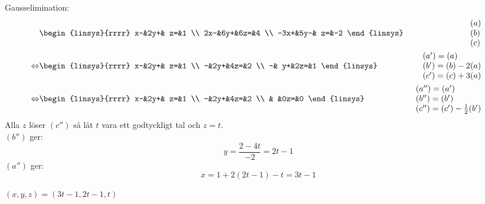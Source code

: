\begin{task}{1.11}
	Gausselimination:
	\begin{align*}
		&\begin{linsys}{rrrr}
			  x-&2y+& z=&1 \\
			 2x-&6y+&6z=&4 \\
			-3x+&5y-& z=&-2
		\end{linsys}
		&\begin{array}{l} 
			(a) \\ 
			(b) \\
			(c) 
		\end{array} \\ \lra
		&\begin{linsys}{rrrr}
			x-&2y+& z=&1 \\
			 -&2y+&4z=&2 \\
			 -& y+&2z=&1
		\end{linsys}
		&\begin{array}{l} 
			(a')=(a) \\ 
			(b')=(b)-2(a) \\
			(c')=(c)+3(a)
		\end{array} \\ \lra
		&\begin{linsys}{rrrr}
			x-&2y+& z=&1 \\
			 -&2y+&4z=&2 \\
			  &   &0z=&0
		\end{linsys}
		&\begin{array}{l} 
			(a'')=(a') \\ 
			(b'')=(b') \\
			(c'')=(c')-\frac{1}{2}(b')
		\end{array}
	\end{align*}
	Alla $z$ löser $(c'')$ så låt $t$ vara ett godtyckligt tal och $z= t$. \\
	$(b'')$ ger:
	\[y=\frac{2-4t}{-2}=2t-1\]
	$(a'')$ ger:
	\[x=1+2(2t-1)-t=3t-1\]
	
	\ans $(x,y,z)=(3t-1,2t-1,t)$
\end{task}

